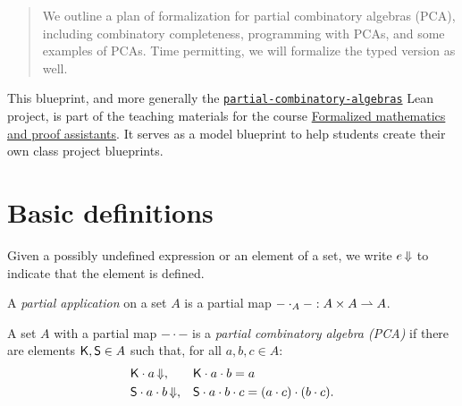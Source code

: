 %

\begin{abstract}
  We outline a plan of formalization for partial combinatory algebras (PCA), including combinatory completeness,
  programming with PCAs, and some examples of PCAs. Time permitting, we will formalize the typed version as well.
\end{abstract}


This blueprint, and more generally the \href{https://github.com/andrejbauer/partial-combinatory-algebras}{\texttt{partial-combinatory-algebras}} Lean project, is part of the teaching materials for the course \href{https://www.andrej.com/zapiski/MAT-FORMATH-2024/book/}{Formalized mathematics and proof assistants}.
It serves as a model blueprint to help students create their own class project blueprints.

\section{Basic definitions}

Given a possibly undefined expression or an element of a set, we write $e\,{\Downarrow}$ to indicate that the element is defined.

\begin{definition}
  \label{def:partial-application}
  \leanok
  A \emph{partial application} on a set $A$ is a partial map ${-} \cdot_A {-} : A \times A \rightharpoonup A$.
\end{definition}

\begin{definition}
  \label{def:PCA}
  \leanok
  A set $A$ with a partial map ${-} \cdot {-}$ is a \emph{partial combinatory algebra (PCA)} if there are
  elements $\mathsf{K}, \mathsf{S} \in A$ such that, for all $a, b, c \in A$:
  \begin{align*}
    &\mathsf{K} \cdot a\,{\Downarrow}, &
    &\mathsf{K} \cdot a \cdot b = a \\
    &\mathsf{S} \cdot a \cdot b\,{\Downarrow}, &
    &\mathsf{S} \cdot a \cdot b \cdot c = (a \cdot c) \cdot (b \cdot c).
  \end{align*}
\end{definition}

